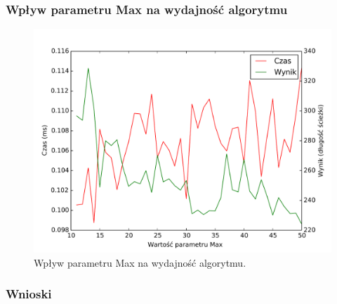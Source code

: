 \documentclass[11pt,a4paper]{article}
\begin{document}
\newpage
\subsubsection{Wpływ parametru Max na wydajność algorytmu}
\begin{figure}[H]
\includegraphics[trim = 0mm 0mm 0mm 12mm, clip, width=14cm]{graphs/max.pdf}
\caption{Wpływ parametru Max na wydajność algorytmu.}
\end{figure}

\subsubsection{Wnioski}

{}

\end{document}
